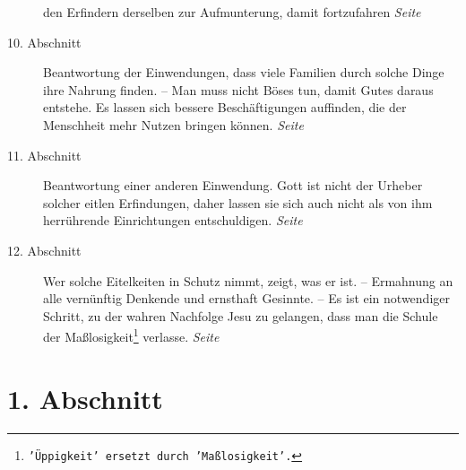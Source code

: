 \begin{description}
den Erfindern derselben zur Aufmunterung, damit fortzufahren
\dotfill \textit{Seite~\pageref{kap17_ab9}}\\
\item[10. Abschnitt] Beantwortung der Einwendungen, dass viele Familien durch
solche Dinge ihre Nahrung finden. -- Man muss nicht Böses tun, damit Gutes
daraus entstehe. Es lassen sich bessere Beschäftigungen auffinden, die der
Menschheit mehr Nutzen bringen können.
\dotfill \textit{Seite~\pageref{kap17_ab10}}\\
\item[11. Abschnitt] Beantwortung einer anderen Einwendung. Gott ist nicht der
Urheber solcher eitlen Erfindungen, daher lassen sie sich auch nicht als von
ihm herrührende Einrichtungen entschuldigen.
\dotfill \textit{Seite~\pageref{kap17_ab11}}\\
\item[12. Abschnitt] Wer solche Eitelkeiten in Schutz nimmt, zeigt, was er ist.
-- Ermahnung an alle vernünftig Denkende und ernsthaft Gesinnte. -- Es ist ein
notwendiger Schritt, zu der wahren Nachfolge Jesu zu gelangen, dass man die
Schule der Maßlosigkeit\footnote{\texttt{'Üppigkeit' ersetzt durch
'Maßlosigkeit'.}}
verlasse.
\dotfill \textit{Seite~\pageref{kap17_ab12}}\\

\end{description}

\newpage

\section{1. Abschnitt} \label{kap17_ab1}

